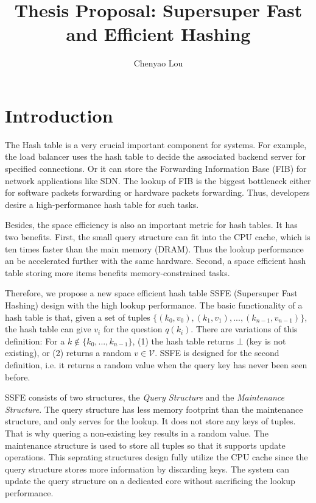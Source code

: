 \documentclass{article}
\title{Thesis Proposal: Supersuper Fast and Efficient Hashing}
\author{Chenyao Lou}
\begin{document}
\maketitle

\newcommand{\qs}{\textit{Query Structure}\xspace}
\newcommand{\ms}{\textit{Maintenance Structure}\xspace}

\section{Introduction}


The Hash table is a very crucial important component for systems. For example, the load balancer uses the hash table to decide the associated backend server for specified connections. Or it can store the Forwarding Information Base (FIB) for network applications \cite{zhou2013scalable} like SDN. The lookup of FIB is the biggest bottleneck either for software packets forwarding or hardware packets forwarding. Thus, developers desire a high-performance hash table for such tasks.

Besides, the space efficiency is also an important metric for hash tables. It has two benefits. First, the small query structure can fit into the CPU cache, which is ten times faster than the main memory (DRAM). Thus the lookup performance an be accelerated further with the same hardware. Second, a space efficient hash table storing more items benefits memory-constrained tasks.


Therefore, we propose a new space efficient hash table SSFE (Supersuper Fast Hashing) design with the high lookup performance. The basic functionality of a hash table is that, given a set of tuples $\{(k_0, v_0), (k_1, v_1), ..., (k_{n-1}, v_{n-1})\}$, the hash table can give $v_i$ for the question $q(k_i)$. There are variations of this definition: For a $k \not\in \{k_0, ..., k_{n-1}\}$, (1) the hash table returns $\bot$ (key is not existing), or (2) returns a random $v \in \mathcal{V}$. SSFE is designed for the second definition, i.e. it returns a random value when the query key has never been seen before.


SSFE consists of two structures, the \textit{Query Structure} and the \textit{Maintenance Structure}. The query structure has less memory footprint than the maintenance structure, and only serves for the lookup. It does not store any keys of tuples. That is why quering a non-existing key results in a random value. The maintenance structure is used to store all tuples so that it supports update operations. This seprating structures design fully utilize the CPU cache since the query structure stores more information by discarding keys. The system can update the query structure on a dedicated core without sacrificing the lookup performance.
\end{document}
